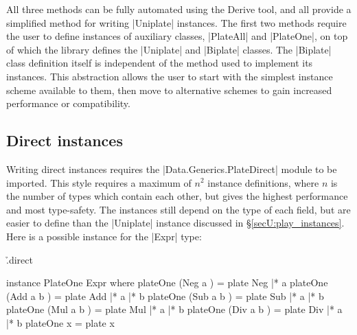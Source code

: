 All three methods can be fully automated using the Derive tool, and all provide a simplified method for writing |Uniplate| instances. The first two methods require the user to define instances of auxiliary classes, |PlateAll| and |PlateOne|, on top of which the library defines the |Uniplate| and |Biplate| classes. The |Biplate| class definition itself is independent of the method used to implement its instances. This abstraction allows the user to start with the simplest instance scheme available to them, then move to alternative schemes to gain increased performance or compatibility.


\subsection{Direct instances}
\label{secU:implement_playdirect}

Writing direct instances requires the |Data.Generics.PlateDirect| module to be imported. This style requires a maximum of $n^2$ instance definitions, where $n$ is the number of types which contain each other, but gives the highest performance and most type-safety. The instances still depend on the type of each field, but are easier to define than the |Uniplate| instance discussed in \S\ref{secU:play_instances}. Here is a possible instance for the |Expr| type:

\begin{comment}
\h{.direct}\begin{code}
class PlateAll from to where
    plateAll :: from -> Type from to
class PlateOne to where
    plateOne :: to -> Type to to
type Type from to = (Str to, Str to -> from)
plate :: from -> Type from to
(|*) :: Type (to -> from) to -> to -> Type from to
(|+) :: PlateAll item to => Type (item -> from) to -> item -> Type from to
(|-) :: Type (item -> from) to -> item -> Type from to
(||*) :: Type ([to] -> from) to -> [to] -> Type from to
(||+) :: PlateAll item to => Type ([item] -> from) to -> [item] -> Type from to
\end{code}
\end{comment}

\h{.direct}\begin{code}
instance PlateOne Expr where
    plateOne (Neg  a    )  = plate Neg  |* a
    plateOne (Add  a b  )  = plate Add  |* a |* b
    plateOne (Sub  a b  )  = plate Sub  |* a |* b
    plateOne (Mul  a b  )  = plate Mul  |* a |* b
    plateOne (Div  a b  )  = plate Div  |* a |* b
    plateOne x             = plate x
\end{code}

